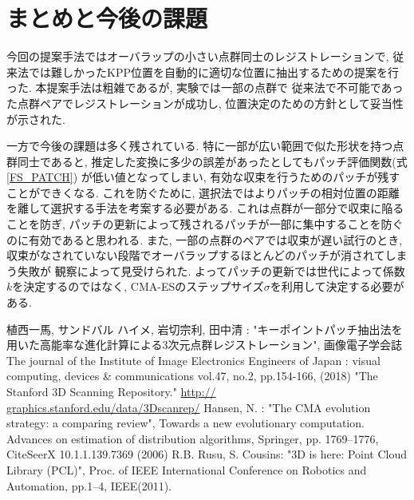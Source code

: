 \documentclass[twocolumn, 9pt, a4j, dvipdfmx]{jsarticle}
\begin{document}
\section{まとめと今後の課題}
今回の提案手法ではオーバラップの小さい点群同士のレジストレーションで, 
従来法では難しかったKPP位置を自動的に適切な位置に抽出するための提案を行った.
本提案手法は粗雑であるが, 実験では一部の点群で
従来法で不可能であった点群ペアでレジストレーションが成功し, 
位置決定のための方針として妥当性が示された. 

一方で今後の課題は多く残されている. 
特に一部が広い範囲で似た形状を持つ点群同士であると, 
推定した変換に多少の誤差があったとしてもパッチ評価関数(式\ref{FS_PATCH})
が低い値となってしまい, 
有効な収束を行うためのパッチが残すことができくなる. 
これを防ぐために, 
選択法ではよりパッチの相対位置の距離を離して選択する手法を考案する必要がある. 
これは点群が一部分で収束に陥ることを防ぎ, 
パッチの更新によって残されるパッチが一部に集中することを防ぐのに有効であると思われる. 
また, 一部の点群のペアでは収束が遅い試行のとき, 
収束がなされていない段階でオーバラップするほとんどのパッチが消されてしまう失敗が
観察によって見受けられた. 
よってパッチの更新では世代によって係数$k$を決定するのではなく, 
CMA-ESのステップサイズ$\sigma$を利用して決定する必要がある. 
\small
\vspace{-0.5em}
\begin{thebibliography}{1}
 植西一馬, サンドバル ハイメ, 岩切宗利, 田中清 : 
"キーポイントパッチ抽出法を用いた高能率な進化計算による3次元点群レジストレーション", 
画像電子学会誌 The journal of the Institute of Image Electronics Engineers of Japan : 
visual computing, devices \& communications vol.47, no.2, pp.154-166, (2018)
 "The Stanford 3D Scanning Repository." \url{http://
graphics.stanford.edu/data/3Dscanrep/} 
 Hansen, N. : 
"The CMA evolution strategy: a comparing review", Towards a new evolutionary 
computation. Advances on estimation of distribution algorithms, 
Springer, pp. 1769–1776, CiteSeerX 10.1.1.139.7369 (2006)
R.B. Rusu, S. Cousins: "3D is here: Point Cloud Library (PCL)", 
Proc. of IEEE International Conference on Robotics and Automation, pp.1–4, 
IEEE(2011).
\end{thebibliography}
\normalsize
\end{document}

